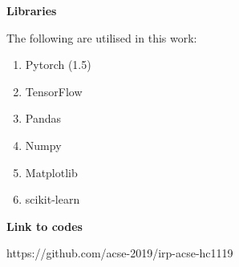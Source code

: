 \textbf{Libraries}

The following are utilised in this work:
\begin{enumerate}
\item Pytorch (1.5)\cite{pyTorch}

\item TensorFlow\cite{tf}

\item Pandas\cite{pandas}

\item Numpy\cite{numpy}

\item Matplotlib\cite{matplotlib}

\item scikit-learn\cite{scikit}
\end{enumerate}

\textbf{Link to codes}

https://github.com/acse-2019/irp-acse-hc1119
